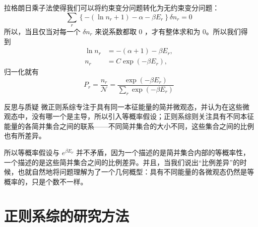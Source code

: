 拉格朗日乘子法使得我们可以将约束变分问题转化为无约束变分问题：
\begin{equation}\label{equ:variational}
    \sum_r\left\{-\left(\ln n_r+1\right)-\alpha-\beta E_r\right\} \delta n_r=0
\end{equation}
所以，当且仅当对每一个 $\delta n_r$ 来说系数都取 $0$ ，才有整体求和为 $0$。所以我们得到
\begin{equation}
        \begin{aligned}
            \ln n_r&=-(\alpha+1)-\beta E_r,\\
            n_r&=C \exp \left(-\beta E_r\right),
            \end{aligned}
\end{equation}
归一化就有
\begin{equation}\label{equ:canonicalprobability}
    P_r = \frac{n_r}{\mathcal{N}}=\frac{\exp \left(-\beta E_r\right)}{\displaystyle\sum_r \exp \left(-\beta E_r\right)}
\end{equation}

\begin{justification}{\kaishu 反思与质疑}
\kaishu \fontsize{11pt}{16pt}
    \quad\quad 微正则系综专注于具有同一本征能量的简并微观态，并认为在这些微观态中，没有哪一个是主导，所以引入等概率假设；正则系综则关注具有不同本征能量的各简并集合之间的联系——不同简并集合的大小不同，这些集合之间的比例也有所差异。

    \quad\quad 所以等概率假设与 $e^{\beta E_\nu}$ 并不矛盾，因为一个描述的是简并集合内部的等概率性，一个描述的是这些简并集合之间的比例差异。并且，当我们说出“比例差异”的时候，也就自然地将问题理解为了一个几何概型：具有不同能量的各微观态仍然是等概率的，只是个数不一样。
\end{justification}

\section{正则系综的研究方法}\label{sec:正则系综的研究方法}

